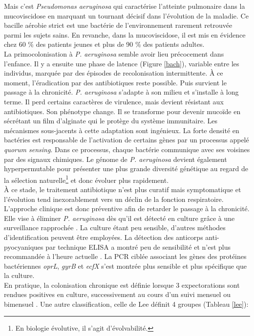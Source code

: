 \documentclass[12pt,a4paper]{article}
\begin{document}
Mais c’est \textit{Pseudomonas aeruginosa} qui caractérise l’atteinte pulmonaire dans la mucoviscidose en marquant un tournant décisif dans l’évolution de la maladie. Ce bacille aérobie strict est une bactérie de l'environnement rarement retrouvée parmi les sujets sains\cite{Plesiat}. En revanche, dans la mucoviscidose, il est mis en évidence\cite{LeBourgeois} chez 60 \% des patients jeunes et plus de 90 \% des patients adultes.\\
La primocolonisation à \textit{P. aeruginosa} semble avoir lieu précocement dans l’enfance\cite{Plesiat}. Il y a ensuite une phase de latence (Figure \ref{bach}), variable entre les individus, marquée par des épisodes de recolonisation intermittente. À ce moment, l’éradication par des antibiotiques reste possible.
Puis survient le passage à la chronicité. \textit{P. aeruginosa} s'adapte à son milieu et s’installe à long terme. Il perd certains caractères de virulence, mais devient résistant aux antibiotiques\cite{LeBourgeois}. Son phénotype change. Il se transforme pour devenir mucoïde en sécrétant un film d’alginate qui le protège du système immunitaire. Les mécanismes sous-jacents à cette adaptation sont ingénieux. La forte densité en bactéries est responsable de l’activation de certains gènes par un processus appelé \textit{quorum sensing}\cite{Ruimy2004}. Dans ce processus, chaque bactérie communique avec ses voisines par des signaux chimiques.
Le génome de \textit{P. aeruginosa} devient également hyperpermutable\cite{Davies} pour présenter une plus grande diversité génétique au regard de la sélection naturelle\footnote{En biologie évolutive, il s'agit d'évolvabilité.} et donc évoluer plus rapidement. \\
À ce stade, le traitement antibiotique n’est plus curatif mais symptomatique et l'évolution tend inexorablement vers un déclin de la fonction respiratoire. \\
L'approche clinique est donc préventive afin de retarder le passage à la chronicité. Elle vise à éliminer \textit{P. aeruginosa} dès qu'il est détecté en culture grâce à une surveillance rapprochée \cite{LeBourgeois}. La culture étant peu sensible, d’autres méthodes d'identification peuvent être employées. La détection des anticorps anti-pyocyaniques par technique ELISA a montré peu de sensibilité et n'est plus recommandée à l'heure actuelle \cite{Microbiologie2015}.
La PCR ciblée associant les gènes des protéines bactériennes \textit{oprL}, \textit{gyrB} et \textit{ecfX} s’est montrée plus sensible et plus spécifique que la culture\cite{Hery-Arnaud2017}. \\
En pratique, la colonisation chronique est définie lorsque 3 expectorations sont rendues positives en culture, successivement au cours d’un suivi mensuel ou bimensuel \cite{LeBourgeois}.
Une autre classification, celle de Lee\cite{Lee2003} définit 4 groupes (Tableau \ref{lee}):
\end{document}
